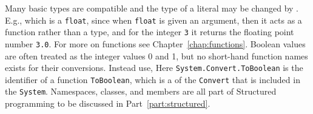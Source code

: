 Many basic types are compatible and the type of a literal may be changed by . E.g.,
%
which is a \lstinline!float!, since when \lstinline|float| is given an argument, then it acts as a function rather than a type, and for the integer \lstinline|3| it returns the floating point number \lstinline|3.0|.  For more on functions see Chapter~\ref{chap:functions}. Boolean values are often treated as the integer values 0 and 1, but no short-hand function names exists for their conversions. Instead use,
%
Here \lstinline|System.Convert.ToBoolean| is the identifier of a function \lstinline|ToBoolean|, which is a  of the  \lstinline|Convert| that is included in the  \lstinline|System|. Namespaces, classes, and members are all part of Structured programming to be discussed in Part~\ref{part:structured}.

